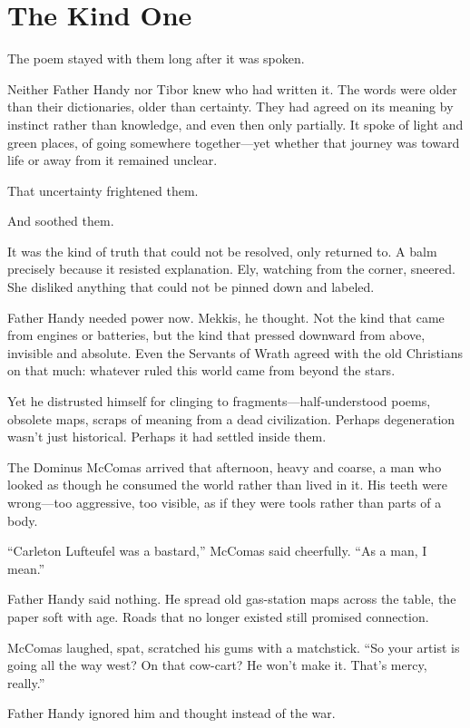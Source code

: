 \chapter{The Kind One}

The poem stayed with them long after it was spoken.

Neither Father Handy nor Tibor knew who had written it. The words were older than their dictionaries, older than certainty. They had agreed on its meaning by instinct rather than knowledge, and even then only partially. It spoke of light and green places, of going somewhere together—yet whether that journey was toward life or away from it remained unclear.

That uncertainty frightened them.

And soothed them.

It was the kind of truth that could not be resolved, only returned to. A balm precisely because it resisted explanation. Ely, watching from the corner, sneered. She disliked anything that could not be pinned down and labeled.

Father Handy needed power now. Mekkis, he thought. Not the kind that came from engines or batteries, but the kind that pressed downward from above, invisible and absolute. Even the Servants of Wrath agreed with the old Christians on that much: whatever ruled this world came from beyond the stars.

Yet he distrusted himself for clinging to fragments—half-understood poems, obsolete maps, scraps of meaning from a dead civilization. Perhaps degeneration wasn’t just historical. Perhaps it had settled inside them.

The Dominus McComas arrived that afternoon, heavy and coarse, a man who looked as though he consumed the world rather than lived in it. His teeth were wrong—too aggressive, too visible, as if they were tools rather than parts of a body.

“Carleton Lufteufel was a bastard,” McComas said cheerfully. “As a man, I mean.”

Father Handy said nothing. He spread old gas-station maps across the table, the paper soft with age. Roads that no longer existed still promised connection.

McComas laughed, spat, scratched his gums with a matchstick. “So your artist is going all the way west? On that cow-cart? He won’t make it. That’s mercy, really.”

Father Handy ignored him and thought instead of the war.

